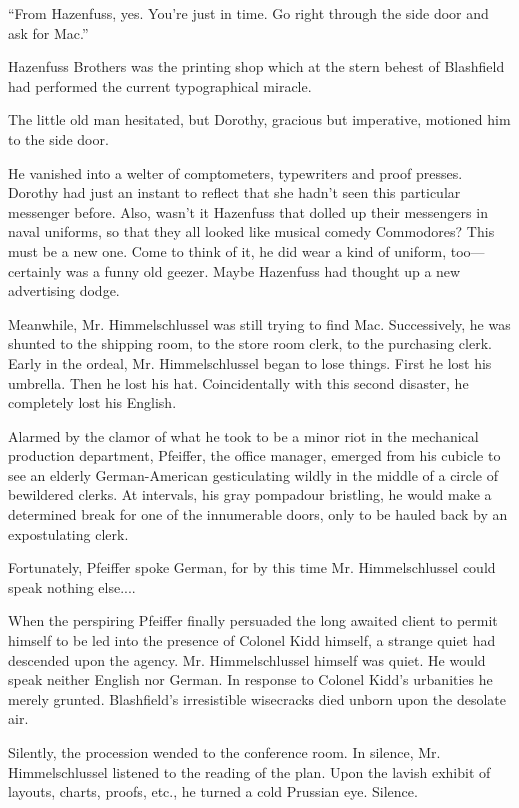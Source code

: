 \documentclass[twoside,nohyper,openany,nobib]{tufte-book}
\begin{document}
``From Hazenfuss, yes. You're just in time. Go right through the side
door and ask for Mac.''

Hazenfuss Brothers was the printing shop which at the stern behest of
Blashfield had performed the current typographical miracle.

The little old man hesitated, but Dorothy, gracious but imperative,
motioned him to the side door.

He vanished into a welter of comptometers, typewriters and proof
presses. Dorothy had just an instant to reflect that she hadn't seen
this particular messenger before. Also, wasn't it Hazenfuss that dolled
up their messengers in naval uniforms, so that they all looked like
musical comedy Commodores? This must be a new one. Come to think of it,
he did wear a kind of uniform, too---certainly was a funny old geezer.
Maybe Hazenfuss had thought up a new advertising dodge.

Meanwhile, Mr. Himmelschlussel was still trying to find Mac.
Successively, he was shunted to the shipping room, to the store room
clerk, to the purchasing clerk. Early in the ordeal, Mr. Himmelschlussel
began to lose things. First he lost his umbrella. Then he lost his hat.
Coincidentally with this second disaster, he completely lost his
English.

Alarmed by the clamor of what he took to be a minor riot in the
mechanical production department, Pfeiffer, the office manager, emerged
from his cubicle to see an elderly German-American gesticulating wildly
in the middle of a circle of bewildered clerks. At intervals, his gray
pompadour bristling, he would make a determined break for one of the
innumerable doors, only to be hauled back by an expostulating clerk.

Fortunately, Pfeiffer spoke German, for by this time Mr. Himmelschlussel
could speak nothing else....

When the perspiring Pfeiffer finally persuaded the long awaited client
to permit himself to be led into the presence of Colonel Kidd himself, a
strange quiet had descended upon the agency. Mr. Himmelschlussel himself
was quiet. He would speak neither English nor German. In response to
Colonel Kidd's urbanities he merely grunted. Blashfield's irresistible
wisecracks died unborn upon the desolate air.

Silently, the procession wended to the conference room. In silence, Mr.
Himmelschlussel listened to the reading of the plan. Upon the lavish
exhibit of layouts, charts, proofs, etc., he turned a cold Prussian eye.
Silence.
\end{document}
